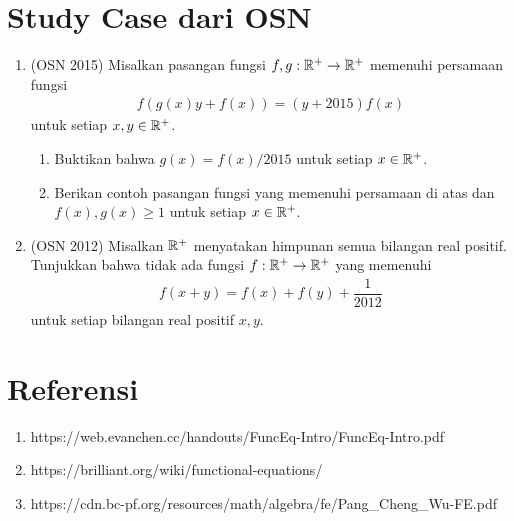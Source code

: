 \documentclass[12pt]{scrartcl}
\begin{document}
\section{Study Case dari OSN}
\begin{enumerate}
    \item (OSN 2015) Misalkan pasangan fungsi $f,g:\mathbb R^+ \to \mathbb R^+$ memenuhi persamaan fungsi
    \begin{align*}
        f(g(x)y+f(x))=(y+2015)f(x)
    \end{align*}
    untuk setiap $x,y \in \mathbb R^+$.
    \begin{enumerate}
        \item Buktikan bahwa $g(x)=f(x)/2015$ untuk setiap $x \in \mathbb R^+$.
        \item Berikan contoh pasangan fungsi yang memenuhi persamaan di atas dan $f(x),g(x) \ge 1$ untuk setiap $x \in \mathbb R^+$.
    \end{enumerate}

    \item (OSN 2012) Misalkan $\mathbb R^+$ menyatakan himpunan semua bilangan real positif. Tunjukkan bahwa tidak ada fungsi $f:\mathbb R^+ \to \mathbb R^+$ yang memenuhi
    \begin{align*}
        f(x+y)=f(x)+f(y)+\dfrac{1}{2012}
    \end{align*}
    untuk setiap bilangan real positif $x,y$.
\end{enumerate}

\section{Referensi}
\begin{enumerate}
    \item https://web.evanchen.cc/handouts/FuncEq-Intro/FuncEq-Intro.pdf
\item https://brilliant.org/wiki/functional-equations/
\item https://cdn.bc-pf.org/resources/math/algebra/fe/Pang\_Cheng\_Wu-FE.pdf
\end{enumerate}
\end{document}
